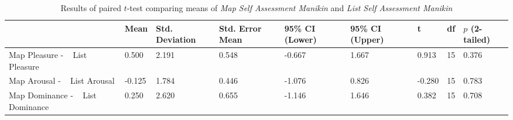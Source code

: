 \begin{landscape}
\begin{table}[hbtp!]
\centering
\caption{Results of paired $t$-test comparing means of \textit{Map Self Assessment Manikin} and \textit{List Self Assessment Manikin}}\vspace{0.3cm}
\label{res:sam}
\begin{tabular}{|m{3cm}|l|l|l|l|l|l|l|l|}
\hline
& Mean & Std. Deviation & Std. Error Mean & 95\% CI (Lower) & 95\% CI (Upper) & t & df & $p$ (2-tailed) \\ \hline\hline
Map Pleasure - ~ List Pleasure & 0.500  & 2.191 & 0.548 & -0.667 & 1.667 & 0.913  & 15 & 0.376 \\ \hline
Map Arousal - ~ List Arousal & -0.125 & 1.784 & 0.446 & -1.076 & 0.826 & -0.280 & 15 & 0.783 \\\hline
Map Dominance - ~ List Dominance & 0.250  & 2.620 & 0.655 & -1.146 & 1.646 & 0.382  & 15 & 0.708 \\ \hline
\end{tabular}
\end{table}

\clearpage


\end{landscape}
